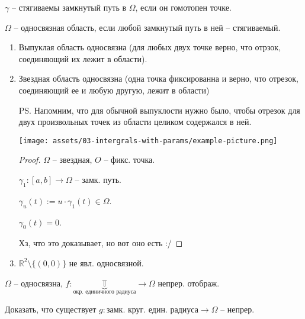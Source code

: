 \begin{definition}
    $\gamma$ -- стягиваемы замкнутый путь в $\Omega$, если он гомотопен точке.
\end{definition}
\begin{definition}
    $\Omega$ -- односвязная область, если любой замкнутый путь в ней -- стягиваемый. 
\end{definition}
\begin{example}
    \begin{enumerate}
        \item {
            Выпуклая область односвязна (для любых двух точке верно, что отрзок, соединяющий их лежит в области).
        }
        \item {
            Звездная область односвязна (одна точка фиксированна и верно, что отрезок, соединяющий ее и любую другую, лежит в области)
            
            PS. Напомним, что для обычной выпуклости нужно было, чтобы отрезок для двух произвольных точек из области целиком содержался в ней.

            \begin{center}
                \texttt{[image: assets/03-intergrals-with-params/example-picture.png]}
            \end{center}

            \begin{proof}
                $\Omega$ -- звездная, $O$ -- фикс. точка.

                $\gamma_1: [a, b] \rightarrow \Omega$ -- замк. путь.

                $\gamma_u(t) := u \cdot \gamma_1(t) \in \Omega$.

                $\gamma_0(t) = 0$.

                Хз, что это доказывает, но вот оно есть :/
            \end{proof}
        }
        \item {
            $\mathbb{R}^2 \setminus \{ (0, 0) \}$ не явл. односвязной.
        }
    \end{enumerate}
\end{example}

\begin{exerc}
    $\Omega$ -- односвязна, $f: \underbrace{\mathbb{T}}_{\text{окр. единичного радиуса}} \rightarrow \Omega$ непрер. отображ.

    Доказать, что существует $g: \text{замк. круг. един. радиуса} \rightarrow \Omega$ -- непрер.
\end{exerc}

